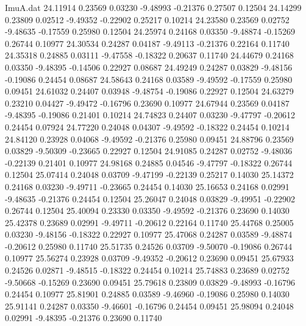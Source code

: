 \begin{filecontents}{ImuA.dat}
  24.11914    0.23569    0.03230   -9.48993   -0.21376    0.27507    0.12504
  24.14299    0.23809    0.02512   -9.49352   -0.22902    0.25217    0.10214
  24.23580    0.23569    0.02752   -9.48635   -0.17559    0.25980    0.12504
  24.25974    0.24168    0.03350   -9.48874   -0.15269    0.26744    0.10977
  24.30534    0.24287    0.04187   -9.49113   -0.21376    0.22164    0.11740
  24.35318    0.24885    0.03111   -9.47558   -0.18322    0.20637    0.11740
  24.44679    0.24168    0.03350   -9.48395   -0.14506    0.22927    0.08687
  24.49249    0.24287    0.03829   -9.48156   -0.19086    0.24454    0.08687
  24.58643    0.24168    0.03589   -9.49592   -0.17559    0.25980    0.09451
  24.61032    0.24407    0.03948   -9.48754   -0.19086    0.22927    0.12504
  24.63279    0.23210    0.04427   -9.49472   -0.16796    0.23690    0.10977
  24.67944    0.23569    0.04187   -9.48395   -0.19086    0.21401    0.10214
  24.74823    0.24407    0.03230   -9.47797   -0.20612    0.24454    0.07924
  24.77220    0.24048    0.04307   -9.49592   -0.18322    0.24454    0.10214
  24.84120    0.23928    0.04068   -9.49592   -0.21376    0.25980    0.09451
  24.88796    0.23569    0.03829   -9.50309   -0.23665    0.22927    0.12504
  24.91085    0.24287    0.02752   -9.48036   -0.22139    0.21401    0.10977
  24.98168    0.24885    0.04546   -9.47797   -0.18322    0.26744    0.12504
  25.07414    0.24048    0.03709   -9.47199   -0.22139    0.25217    0.14030
  25.14372    0.24168    0.03230   -9.49711   -0.23665    0.24454    0.14030
  25.16653    0.24168    0.02991   -9.48635   -0.21376    0.24454    0.12504
  25.26047    0.24048    0.03829   -9.49951   -0.22902    0.26744    0.12504
  25.40094    0.23330    0.03350   -9.49592   -0.21376    0.23690    0.14030
  25.42378    0.23689    0.02991   -9.49711   -0.20612    0.22164    0.11740
  25.44768    0.25005    0.03230   -9.48156   -0.18322    0.22927    0.10977
  25.47068    0.24287    0.03589   -9.48874   -0.20612    0.25980    0.11740
  25.51735    0.24526    0.03709   -9.50070   -0.19086    0.26744    0.10977
  25.56274    0.23928    0.03709   -9.49352   -0.20612    0.23690    0.09451
  25.67933    0.24526    0.02871   -9.48515   -0.18322    0.24454    0.10214
  25.74883    0.23689    0.02752   -9.50668   -0.15269    0.23690    0.09451
  25.79618    0.23809    0.03829   -9.48993   -0.16796    0.24454    0.10977
  25.81901    0.24885    0.03589   -9.46960   -0.19086    0.25980    0.14030
  25.91141    0.24287    0.03350   -9.46601   -0.16796    0.24454    0.09451
  25.98094    0.24048    0.02991   -9.48395   -0.21376    0.23690    0.11740

\end{filecontents}
